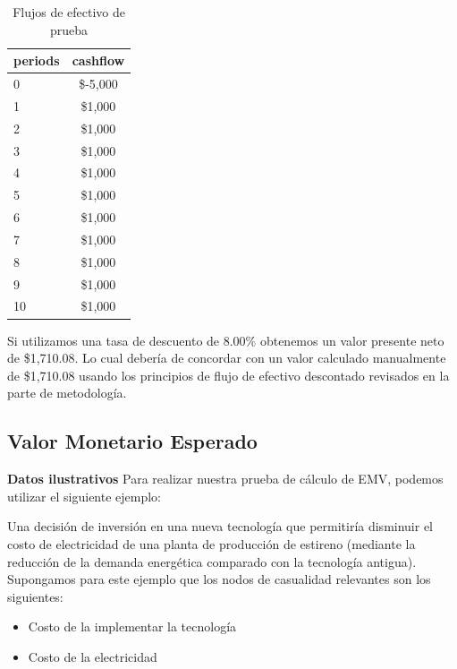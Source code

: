 \documentclass[
]{book}
\providecommand{\tightlist}{%
  \setlength{\itemsep}{0pt}\setlength{\parskip}{0pt}}
\begin{document}
\begin{table}

\caption{\label{tab:testcashflow1}Flujos de efectivo de prueba}
\centering
\begin{tabular}[t]{l|c}
\hline
periods & cashflow\\
\hline
0 & \$-5,000\\
\hline
1 & \$1,000\\
\hline
2 & \$1,000\\
\hline
3 & \$1,000\\
\hline
4 & \$1,000\\
\hline
5 & \$1,000\\
\hline
6 & \$1,000\\
\hline
7 & \$1,000\\
\hline
8 & \$1,000\\
\hline
9 & \$1,000\\
\hline
10 & \$1,000\\
\hline
\end{tabular}
\end{table}

Si utilizamos una tasa de descuento de 8.00\% obtenemos un
valor presente neto de \$1,710.08. Lo cual debería de concordar con un
valor calculado manualmente de \$1,710.08 usando los principios de flujo
de efectivo descontado revisados en la parte de metodología.

\newpage

\hypertarget{valor-monetario-esperado-1}{%
\subsection{Valor Monetario Esperado}\label{valor-monetario-esperado-1}}

\textbf{Datos ilustrativos} \newline Para realizar nuestra prueba de cálculo
de EMV, podemos utilizar el siguiente ejemplo:

Una decisión de inversión en una nueva tecnología que permitiría
disminuir el costo de electricidad de una planta de producción de
estireno (mediante la reducción de la demanda energética comparado con
la tecnología antigua). Supongamos para este ejemplo que los nodos de
casualidad relevantes son los siguientes:

\begin{itemize}
\tightlist
\item
  Costo de la implementar la tecnología
\item
  Costo de la electricidad
\end{itemize}
\end{document}
